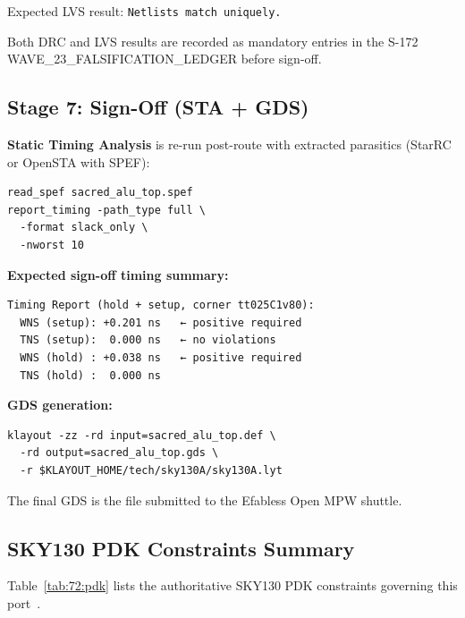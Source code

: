 Expected LVS result: \texttt{Netlists match uniquely.}

Both DRC and LVS results are recorded as mandatory entries in the
S-172 WAVE\_23\_FALSIFICATION\_LEDGER before sign-off.

\subsection{Stage 7: Sign-Off (STA + GDS)}
\label{subsec:72:stage7-signoff}

\textbf{Static Timing Analysis} is re-run post-route with
extracted parasitics (StarRC or OpenSTA with SPEF):

\begin{verbatim}
read_spef sacred_alu_top.spef
report_timing -path_type full \
  -format slack_only \
  -nworst 10
\end{verbatim}

\textbf{Expected sign-off timing summary:}

\begin{verbatim}
Timing Report (hold + setup, corner tt025C1v80):
  WNS (setup): +0.201 ns   ← positive required
  TNS (setup):  0.000 ns   ← no violations
  WNS (hold) : +0.038 ns   ← positive required
  TNS (hold) :  0.000 ns
\end{verbatim}

\textbf{GDS generation:}

\begin{verbatim}
klayout -zz -rd input=sacred_alu_top.def \
  -rd output=sacred_alu_top.gds \
  -r $KLAYOUT_HOME/tech/sky130A/sky130A.lyt
\end{verbatim}

The final GDS is the file submitted to the Efabless Open MPW shuttle.

\subsection{SKY130 PDK Constraints Summary}
\label{subsec:72:pdk-constraints}

Table~\ref{tab:72:pdk} lists the authoritative SKY130 PDK constraints
governing this port~\cite{edwards2022sky130}.

